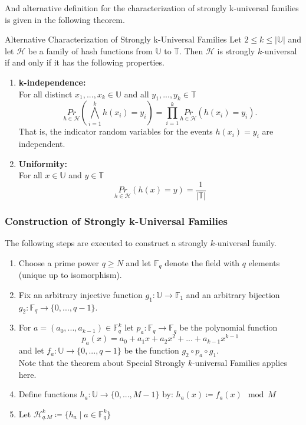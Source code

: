 \documentclass[english]{panikzettel}
\begin{document}
And alternative definition for the characterization of
strongly k-universal families is given in the following theorem.

\begin{theo}{Alternative Characterization of Strongly k-Universal Families}
Let $2\leq k\leq |\mathbb{U}|$ and let $\mathcal{H}$ be a family of hash functions from $\mathbb{U}$ to $\mathbb{T}$. Then $\mathcal{H}$ is strongly $k$-universal if and only if it has the following properties.
\begin{enumerate}
\item \textbf{k-independence:}\\
For all distinct $x_1,...,x_k\in\mathbb{U}$ and all $y_1,...,y_k\in\mathbb{T}$
\[
\underset{h\in\mathcal{H}}{Pr}\left( \bigwedge_{i=1}^k h(x_i)=y_i \right) = \prod_{i=1}^k \underset{h\in\mathcal{H}}{Pr}(h(x_i)=y_i).
\]
That is, the indicator random variables for the events
$h(x_i)=y_i$ are independent.
\item \textbf{Uniformity:}\\
For all $x\in\mathbb{U}$ and $y\in\mathbb{T}$
\[
\underset{h\in\mathcal{H}}{Pr} (h(x)=y)=\frac{1}{|\mathbb{T}|}
\]
\end{enumerate}
\end{theo}

\subsubsection{Construction of Strongly k-Universal Families}
The following steps are executed to construct a strongly $k$-universal family.
\begin{enumerate}
\item Choose a prime power $q\geq N$ and let $\mathbb{F}_q$ denote the field with $q$ elements (unique up to isomorphism).
\item Fix an arbitrary injective function $g_1:\mathbb{U}\to\mathbb{F}_1$ and an arbitrary bijection $g_2:\mathbb{F}_q\to \{0,...,q-1 \}$.
\item For $a=(a_0,...,a_{k-1})\in\mathbb{F}_q^k$ let $p_a:\mathbb{F}_q\to \mathbb{F}_q$ be the polynomial function
\[
p_a(x)=a_0+a_1x+a_2x^2+...+a_{k-1}x^{k-1}
\]
and let $f_a:\mathbb{U}\to \{0,...,q-1 \}$ be the function $g_2\circ p_a\circ g_1$.\\
Note that the theorem about Special Strongly $k$-universal Families applies here.
\item Define functions $h_a:\mathbb{U}\to \{0,...,M-1\}$ by: $h_a(x)\coloneqq f_a(x) \mod M$
\item Let $\mathcal{H}_{q.M}^k\coloneqq \{h_a\mid a\in \mathbb{F}_q^k \}$
\end{enumerate}
\end{document}
